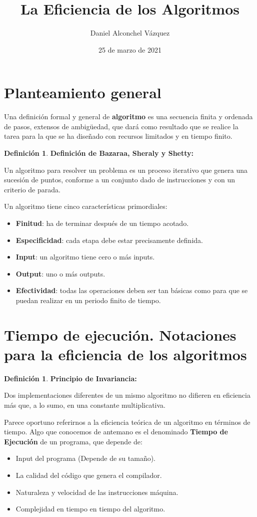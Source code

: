 \documentclass[a4paper, 12pt]{article}
\title{La Eficiencia de los Algoritmos}
\author{Daniel Alconchel Vázquez}
\date{25 de marzo de 2021}
\theoremstyle{plain}
\theoremstyle{definition}
\newtheorem{definicion}[teorema]{Definición}
\theoremstyle{remark}
\begin{document}
	\maketitle
	\newpage
	\tableofcontents
	\newpage
	
	\section{Planteamiento general}
	Una definición formal y general de \textbf{algoritmo} es una secuencia finita y ordenada de pasos, extensos de ambigüedad, que dará como resultado que se realice la tarea para la que se ha diseñado con recursos limitados y en tiempo finito.
	
	\begin{definicion}\label{Bazaraa}
		\textbf{Definición de Bazaraa, Sheraly y Shetty:}
		
		Un algoritmo para resolver un problema es un proceso iterativo que genera una sucesión de puntos, conforme a un conjunto dado de instrucciones y con un criterio de parada.
	\end{definicion}

	\medskip
	Un algoritmo tiene cinco características primordiales:
	\begin{itemize}
		\item \textbf{Finitud}: ha de terminar después de un tiempo acotado.
		\item \textbf{Especificidad}: cada etapa debe estar precisamente definida.
		\item \textbf{Input}: un algoritmo tiene cero o más inputs.
		\item \textbf{Output}: uno o más outputs.
		\item \textbf{Efectividad}: todas las operaciones deben ser tan básicas como para que se puedan realizar en un periodo finito de tiempo.
	\end{itemize}

	\section{Tiempo de ejecución. Notaciones para la eficiencia de los algoritmos}
	\begin{definicion}
		\textbf{Principio de Invariancia:}
		
		Dos implementaciones diferentes de un mismo algoritmo no difieren en eficiencia más que, a lo sumo, en una constante multiplicativa.
	\end{definicion}

	Parece oportuno referirnos a la eficiencia teórica de un algoritmo en términos de tiempo. Algo que conocemos de antemano es el denominado \textbf{Tiempo de Ejecución} de un programa, que depende de:
	\begin{itemize}
		\item Input del programa (Depende de su tamaño).
		\item La calidad del código que genera el compilador.
		\item Naturaleza y velocidad de las instrucciones máquina.
		\item Complejidad en tiempo en tiempo del algoritmo.
	\end{itemize}
\end{document}
